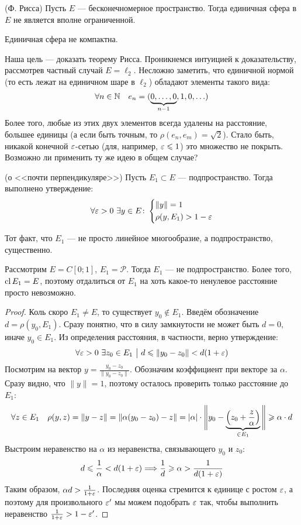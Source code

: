 \begin{theorem} (Ф. Рисса)
	Пусть $E$ --- бесконечномерное пространство. Тогда единичная сфера в $E$ не является вполне ограниченной.
\end{theorem}

\begin{corollary}
	Единичная сфера не компактна.
\end{corollary}

\begin{note}
	Наша цель --- доказать теорему Рисса. Проникнемся интуицией к доказательству, рассмотрев частный случай $E = \ell_2$. Несложно заметить, что единичной нормой (то есть лежат на единичном шаре в $\ell_2$) обладают элементы такого вида:
	\[
		\forall n \in \mathbb{N}\quad e_n = (\underbrace{0, \ldots, 0}_{n - 1}, 1, 0, \ldots)
	\]
	Более того, любые из этих двух элементов всегда удалены на расстояние, большее единицы (а если быть точным, то $\rho(e_n, e_m) = \sqrt{2}$). Стало быть, никакой конечной $\varepsilon$-сетью (для, например, $\varepsilon \leqslant 1$) это множество не покрыть. Возможно ли применить ту же идею в общем случае?
\end{note}

\begin{lemma} (о <<почти перпендикуляре>>)
	Пусть $E_1 \subset E$ --- подпространство. Тогда выполнено утверждение:
	\[
		\forall \varepsilon > 0\ \exists y \in E \colon \left\{ \begin{aligned} 
			&{\|y\| = 1}
			\\
			&{\rho(y, E_1) > 1 - \varepsilon}
		 \end{aligned} \right.
	\]
\end{lemma}

\begin{note}
	Тот факт, что $E_1$ --- не просто линейное многообразие, а подпространство, существенно.
	
	Рассмотрим $E = C[0; 1]$, $E_1 = \mathcal{P}$. Тогда $E_1$ --- не подпространство. Более того, $\operatorname{cl} E_1 = E$, поэтому отдалиться от $E_1$ на хоть какое-то ненулевое расстояние просто невозможно.
\end{note}

\begin{proof}
	Коль скоро $E_1 \neq E$, то существует $y_0 \notin E_1$. Введём обозначение $d = \rho(y_0, E_1)$. Сразу понятно, что в силу замкнутости не может быть $d = 0$, иначе $y_0 \in E_1$. Из определения расстояния, в частности, верно утверждение:
	\[
		\forall \varepsilon > 0\ \exists z_0 \in E_1 \ \big|\  d \leqslant \|y_0 - z_0\| < d(1 + \varepsilon)
	\]
	Посмотрим на вектор $y = \frac{y_0 - z_0}{\|y_0 - z_0\|}$. Обозначим коэффициент при векторе за $\alpha$. Сразу видно, что $\|y\| = 1$, поэтому осталось проверить только расстояние до $E_1$:
	\[
		\forall z \in E_1\quad \rho(y, z) = \|y - z\| = \|\alpha(y_0 - z_0) - z\| = |\alpha| \cdot \Bigg\|y_0 - \underbrace{\left(z_0 + \frac{z}{\alpha}\right)}_{\in E_1}\Bigg\| \geqslant \alpha \cdot d
	\]
	Выстроим неравенство на $\alpha$ из неравенства, связывающего $y_0$ и $z_0$:
	\[
		d \leqslant \frac{1}{\alpha} < d(1 + \varepsilon) \Longrightarrow \frac{1}{d} \geqslant \alpha > \frac{1}{d(1 + \varepsilon)}
	\]
	Таким образом, $\alpha d > \frac{1}{1 + \varepsilon}$. Последняя оценка стремится к единице с ростом $\varepsilon$, а поэтому для произвольного $\varepsilon'$ мы можем подобрать $\varepsilon$ так, чтобы выполнить неравенство $\frac{1}{1 + \varepsilon} > 1 - \varepsilon'$.
\end{proof}


